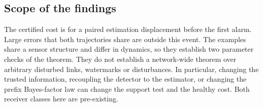 \subsection{Scope of the findings}

The certified cost is for a paired estimation displacement before the first alarm. Large errors that both trajectories share are outside this event. The examples share a sensor structure and differ in dynamics, so they establish two parameter checks of the theorem. They do not establish a network-wide theorem over arbitrary disturbed links, watermarks or disturbances. In particular, changing the trusted information, recoupling the detector to the estimator, or changing the prefix Bayes-factor law can change the support test and the healthy cost. Both receiver classes here are pre-existing.
